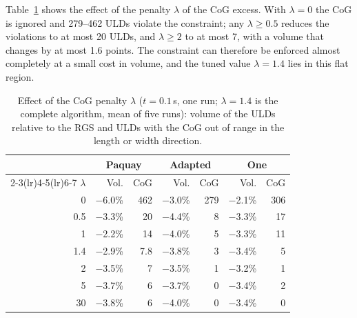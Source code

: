 Table~\ref{tab:lambda} shows the effect of the penalty $\lambda$ of the CoG excess. With
$\lambda = 0$ the CoG is ignored and 279--462 ULDs violate the constraint; any $\lambda \ge 0.5$
reduces the violations to at most 20 ULDs, and $\lambda \ge 2$ to at most 7, with a volume that
changes by at most 1.6 points. The constraint can therefore be enforced almost completely at a
small cost in volume, and the tuned value $\lambda = 1.4$ lies in this flat region.

\begin{table}[htbp]
\centering
\small
\caption{Effect of the CoG penalty $\lambda$ ($t = 0.1$\,s, one run; $\lambda = 1.4$ is the
complete algorithm, mean of five runs): volume of the ULDs relative to the RGS and ULDs with the
CoG out of range in the length or width direction.}
\label{tab:lambda}
\begin{tabular}{rrrrrrr}
\toprule
 & \multicolumn{2}{c}{Paquay} & \multicolumn{2}{c}{Adapted} & \multicolumn{2}{c}{One} \\
\cmidrule(lr){2-3}\cmidrule(lr){4-5}\cmidrule(lr){6-7}
$\lambda$ & Vol. & CoG & Vol. & CoG & Vol. & CoG \\
\midrule
0 & $-$6.0\% & 462 & $-$3.0\% & 279 & $-$2.1\% & 306 \\
0.5 & $-$3.3\% & 20 & $-$4.4\% & 8 & $-$3.3\% & 17 \\
1 & $-$2.2\% & 14 & $-$4.0\% & 5 & $-$3.3\% & 11 \\
1.4 & $-$2.9\% & 7.8 & $-$3.8\% & 3 & $-$3.4\% & 5 \\
2 & $-$3.5\% & 7 & $-$3.5\% & 1 & $-$3.2\% & 1 \\
5 & $-$3.7\% & 6 & $-$3.7\% & 0 & $-$3.4\% & 2 \\
30 & $-$3.8\% & 6 & $-$4.0\% & 0 & $-$3.4\% & 0 \\
\bottomrule
\end{tabular}
\end{table}
